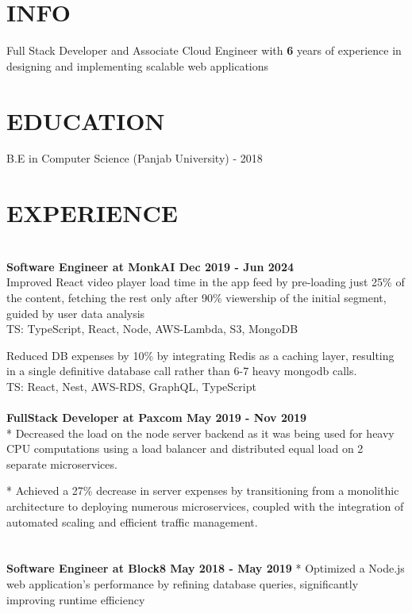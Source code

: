 \documentclass[line, margin, 12pt]{res}
\newcommand\aspace[1][5cm]{\hspace*{#1}} %
\begin{document}
\name{\aspace \huge\bf{\href{https://darshan.sh}{Darshan Sharma}}}
\address{\hspace{10mm}
~\textbullet~\href{mailto:thedarshansharma@gmail.com}{thedarshansharma@gmail.com} 
~\textbullet~+91-700-974-6321 
~\textbullet~{\href{https://darshan.sh}{darshan.sh}}~\aspace}

\begin{resume}

\section{INFO}
Full Stack Developer and Associate Cloud Engineer with \textbf{6} years of experience in designing and implementing scalable web applications

\section{EDUCATION}
B.E in Computer Science (Panjab University) - 2018

\section{EXPERIENCE}

\\ \textbf {Software Engineer at MonkAI \hspace{23mm} Dec 2019 - Jun 2024} \\
Improved React video player load time in the app feed by pre-loading just 25\% of the content, fetching the rest only after 90\% viewership of the initial segment, guided by user data analysis \\
TS: TypeScript, React, Node, AWS-Lambda, S3, MongoDB

Reduced DB expenses by 10\% by integrating Redis as a caching layer, resulting in a single definitive database call rather than 6-7 heavy mongodb calls. \\
TS: React, Nest, AWS-RDS, GraphQL, TypeScript \\
\\
\textbf{FullStack Developer at Paxcom \hspace{23mm} May 2019 - Nov 2019} \\
* Decreased the load on the node server backend as it was being used for heavy CPU computations using a load balancer and distributed equal load on 2 separate microservices.

* Achieved a 27\% decrease in server expenses by transitioning from a monolithic architecture to deploying numerous microservices, coupled with the integration of automated scaling and efficient traffic management.\\
\\
\\ \textbf{Software Engineer at Block8 \hspace{27mm} May 2018 - May 2019}
* Optimized a Node.js web application's performance by refining database queries, significantly improving runtime efficiency



\end{resume}
\end{document}
